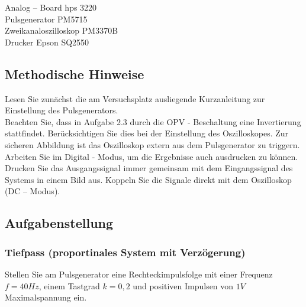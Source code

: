 Analog – Board hps 3220 \\
Pulsgenerator PM5715 \\
Zweikanaloszilloskop PM3370B \\
Drucker Epson SQ2550\\

\subsection{Methodische Hinweise}

Lesen Sie zunächst die am Versuchsplatz ausliegende Kurzanleitung zur Einstellung des Pulsgenerators. \\
Beachten Sie, dass in Aufgabe 2.3 durch die OPV - Beschaltung eine Invertierung stattfindet. Berücksichtigen 
Sie dies bei der Einstellung des Oszilloskopes. Zur sicheren Abbildung ist das Oszilloskop extern aus dem 
Pulsgenerator zu triggern. Arbeiten Sie im Digital - Modus, um die Ergebnisse auch ausdrucken zu können. 
Drucken Sie das Ausgangssignal immer gemeinsam mit dem Eingangssignal des Systems in einem Bild aus. 
Koppeln Sie die Signale direkt mit dem Oszilloskop (DC – Modus).

\subsection{Aufgabenstellung}

\subsubsection{Tiefpass (proportinales System mit Verzögerung)}

Stellen Sie am Pulsgenerator eine Rechteckimpulsfolge mit einer Frequenz $f = 40 Hz$, einem Tastgrad 
$k = 0,2$ und positiven Impulsen von $1V$ Maximalspannung ein. 

